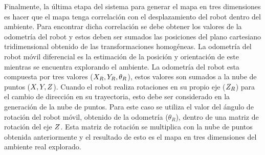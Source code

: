 
Finalmente, la última etapa del sistema para generar el mapa en tres dimensiones es 
hacer que el mapa tenga correlación con el desplazamiento del robot dentro del 
ambiente. Para encontrar dicha correlación se debe obtener los valores de la odometría
del robot y estos deben ser sumados las posiciones del plano cartesiano tridimensional 
obtenido de las transformaciones homogéneas. La odometría del robot móvil diferencial 
es la estimación de la posición y orientación de este mientras se encuentra explorando 
el ambiente. La odometría del robot esta compuesta por tres valores 
($\mathnormal X_{R}, \mathnormal Y_{R}, \theta_{R}$), estos valores son sumados a la nube de puntos
($\mathnormal X, \mathnormal Y, \mathnormal Z$). Cuando el robot realiza rotaciones en su propio eje ($\mathnormal Z_{R}$) 
para el cambio de dirección en su trayectoria, esto debe ser considerado en la generación 
de la nube de puntos. Para este caso se utiliza el valor del ángulo de rotación del
robot móvil, obtenido de la odometría ($\theta_{R}$), dentro de una matriz de rotación del 
eje $\mathnormal Z$. Esta matriz de rotación se multiplica con la nube de puntos obtenida 
anteriormente y el resultado de esto es el mapa en tres dimensiones del ambiente real 
explorado.




